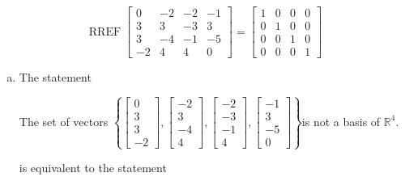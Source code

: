 \begin{exerciseAnswer} 


\[\operatorname{RREF} \left[\begin{array}{cccc}
0 & -2 & -2 & -1 \\
3 & 3 & -3 & 3 \\
3 & -4 & -1 & -5 \\
-2 & 4 & 4 & 0
\end{array}\right] = \left[\begin{array}{cccc}
1 & 0 & 0 & 0 \\
0 & 1 & 0 & 0 \\
0 & 0 & 1 & 0 \\
0 & 0 & 0 & 1
\end{array}\right] \]


\begin{enumerate}[(a)]
\item The statement 
\begin{center}\begin{minipage}{0.8\textwidth}
 The set of vectors \( \left\{ \left[\begin{array}{c}
0 \\
3 \\
3 \\
-2
\end{array}\right] , \left[\begin{array}{c}
-2 \\
3 \\
-4 \\
4
\end{array}\right] , \left[\begin{array}{c}
-2 \\
-3 \\
-1 \\
4
\end{array}\right] , \left[\begin{array}{c}
-1 \\
3 \\
-5 \\
0
\end{array}\right] \right\} \)is not a basis of \(\mathbb{R}^4\). 
\end{minipage}\end{center}
     is equivalent to the statement 
\begin{center}\begin{minipage}{0.8\textwidth}
 The set of vectors \( \left\{ \left[\begin{array}{c}
0 \\
3 \\

\end{array}
\end{minipage}
\end{center}
\end{enumerate}
\end{exerciseAnswer}
